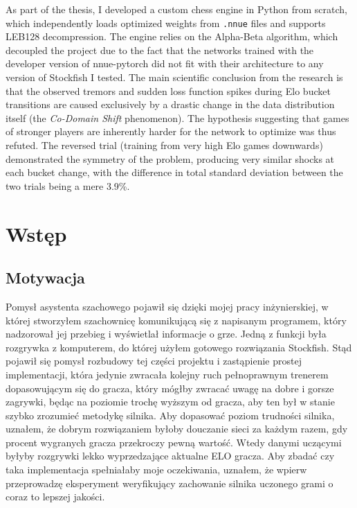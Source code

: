 \documentclass[12pt,a4paper]{report}
\begin{document}
As part of the thesis, I developed a custom chess engine in Python from scratch, which independently loads optimized weights from \texttt{.nnue} files and supports LEB128 decompression. The engine relies on the Alpha-Beta algorithm, which decoupled the project due to the fact that the networks trained with the developer version of nnue-pytorch did not fit with their architecture to any version of Stockfish I tested. The main scientific conclusion from the research is that the observed tremors and sudden loss function spikes during Elo bucket transitions are caused exclusively by a drastic change in the data distribution itself (the \textit{Co-Domain Shift} phenomenon). The hypothesis suggesting that games of stronger players are inherently harder for the network to optimize was thus refuted. The reversed trial (training from very high Elo games downwards) demonstrated the symmetry of the problem, producing very similar shocks at each bucket change, with the difference in total standard deviation between the two trials being a mere 3.9\%.

\chapter{Wstęp}

\section{Motywacja}

Pomysł asystenta szachowego pojawił się dzięki mojej pracy inżynierskiej, w której stworzyłem szachownicę komunikującą się z napisanym programem, który nadzorował jej przebieg i wyświetlał informacje o grze. Jedną z funkcji była rozgrywka z komputerem, do której użyłem gotowego rozwiązania Stockfish. Stąd pojawił się pomysł rozbudowy tej części projektu i zastąpienie prostej implementacji, która jedynie zwracała kolejny ruch pełnoprawnym trenerem dopasowującym się do gracza, który mógłby zwracać uwagę na dobre i gorsze zagrywki, będąc na poziomie trochę wyższym od gracza, aby ten był w stanie szybko zrozumieć metodykę silnika. Aby dopasować poziom trudności silnika, uznałem, że dobrym rozwiązaniem byłoby douczanie sieci za każdym razem, gdy procent wygranych gracza przekroczy pewną wartość. Wtedy danymi uczącymi byłyby rozgrywki lekko wyprzedzające aktualne ELO gracza. Aby zbadać czy taka implementacja spełniałaby moje oczekiwania, uznałem, że wpierw przeprowadzę eksperyment weryfikujący zachowanie silnika uczonego grami o coraz to lepszej jakości.
\end{document}
